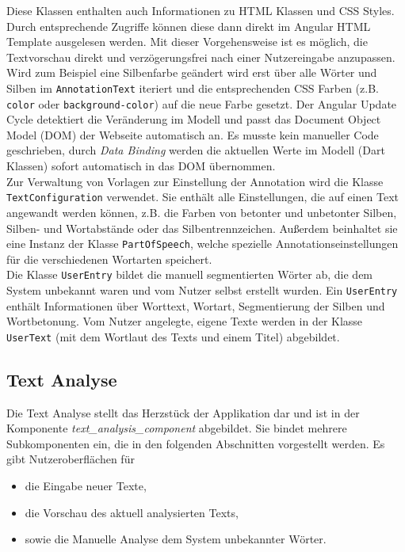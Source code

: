 Diese Klassen enthalten auch Informationen zu HTML Klassen und CSS Styles. Durch entsprechende Zugriffe können diese dann direkt im Angular HTML Template ausgelesen werden. Mit dieser Vorgehensweise ist es möglich, die Textvorschau direkt und verzögerungsfrei nach einer Nutzereingabe anzupassen. Wird zum Beispiel eine Silbenfarbe geändert wird erst über alle Wörter und Silben im \texttt{AnnotationText} iteriert und die entsprechenden CSS Farben (z.B. \texttt{color} oder \texttt{background-color}) auf die neue Farbe gesetzt. Der Angular Update Cycle  detektiert die Veränderung im Modell und passt das Document Object Model (DOM) der Webseite automatisch an. Es musste kein manueller Code geschrieben, durch \textit{Data Binding} werden die aktuellen Werte im Modell (Dart Klassen) sofort automatisch in das DOM übernommen.\\

Zur Verwaltung von Vorlagen zur Einstellung der Annotation wird die Klasse \texttt{TextConfiguration} verwendet. Sie enthält alle Einstellungen, die auf einen Text angewandt werden können, z.B. die Farben von betonter und unbetonter Silben, Silben- und Wortabstände oder das Silbentrennzeichen. Außerdem beinhaltet sie eine Instanz der Klasse \texttt{PartOfSpeech}, welche spezielle Annotationseinstellungen für die verschiedenen Wortarten speichert.
\\

Die Klasse \texttt{UserEntry} bildet die manuell segmentierten Wörter ab, die dem System unbekannt waren und vom Nutzer selbst erstellt wurden. Ein \texttt{UserEntry} enthält Informationen über Worttext, Wortart, Segmentierung der Silben und Wortbetonung. Vom Nutzer angelegte, eigene Texte werden in der Klasse \texttt{UserText} (mit dem Wortlaut des Texts und einem Titel) abgebildet.

\subsection{Text Analyse}

Die Text Analyse stellt das Herzstück der Applikation dar und ist in der Komponente \textit{text\_analysis\_component} abgebildet. Sie bindet mehrere Subkomponenten ein, die in den folgenden Abschnitten vorgestellt werden. Es gibt Nutzeroberflächen für
\begin{itemize}
	\item die Eingabe neuer Texte,
	\item die Vorschau des aktuell analysierten Texts,
	\item sowie die Manuelle Analyse dem System unbekannter Wörter.
\end{itemize}

